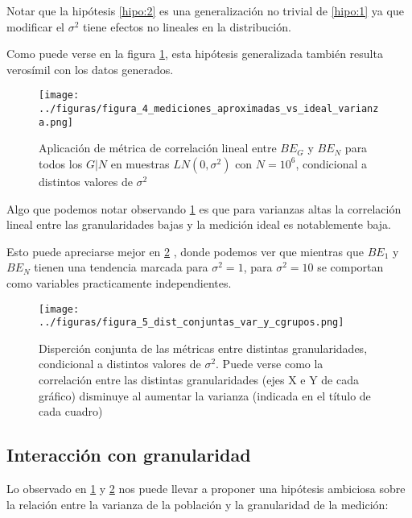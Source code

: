 Notar que la hipótesis \ref{hipo:2} es una generalización no trivial de \ref{hipo:1} ya que modificar el $\sigma^2$ tiene efectos no lineales en la distribución.

Como puede verse en la figura \ref{fig:4}, esta hipótesis generalizada también resulta verosímil con los datos generados.

\begin{figure}[H]
    \centering 
    \texttt{[image: ../figuras/figura\_4\_mediciones\_aproximadas\_vs\_ideal\_varianza.png]} 
    \caption{Aplicación de métrica de correlación lineal entre $BE_G$ y $BE_N$ para todos los $G | N$ en muestras $LN(0,\sigma^2)$ con $N=10^6$, condicional a distintos valores de $\sigma^2$}
    \label{fig:4}
\end{figure}

Algo que podemos notar observando \ref{fig:4} es que para varianzas altas la correlación lineal entre las granularidades bajas y la medición ideal es notablemente baja.

Esto puede apreciarse mejor en \ref{fig:5} , donde podemos ver que mientras que $BE_1$ y $BE_N$ tienen una tendencia marcada para $\sigma^2=1$, para $\sigma^2=10$ se comportan como variables practicamente independientes.

\begin{figure}[H]
    \centering 
    \texttt{[image: ../figuras/figura\_5\_dist\_conjuntas\_var\_y\_cgrupos.png]} 
    \caption{Disperción conjunta de las métricas entre distintas granularidades, condicional a distintos valores de $\sigma^2$. Puede verse como la correlación entre las distintas granularidades (ejes X e Y de cada gráfico) disminuye al aumentar la varianza (indicada en el título de cada cuadro)}
    \label{fig:5}
\end{figure}



\subsection{Interacción con granularidad}

Lo observado en \ref{fig:4} y \ref{fig:5} nos puede llevar a proponer una hipótesis ambiciosa sobre la relación entre la varianza de la población y la granularidad de la medición:


